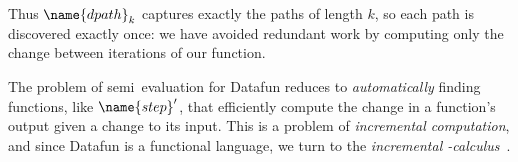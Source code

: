 \noindent
Thus $\name{dpath}_k$ captures exactly the paths of length $k$, so each path is discovered exactly once: we have avoided redundant work by computing only the change between iterations of our  function.

The problem of semi\naive\ evaluation for Datafun reduces to \emph{automatically} finding functions, like $\name{step}'$, that efficiently compute the change in a function's output given a change to its input.
%
%
This is a problem of \emph{incremental computation}, and since Datafun is a
functional language, we turn to the \emph{incremental
  \fn-calculus}~\citep{incremental,DBLP:conf/esop/GiarrussoRS19,DBLP:phd/dnb/Giarrusso20}.







